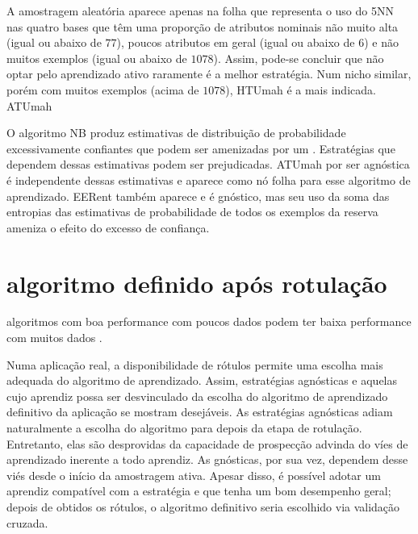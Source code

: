 A amostragem aleatória aparece apenas na folha que representa o uso do 5NN nas quatro bases que têm
uma proporção de atributos nominais não muito alta (igual ou abaixo de $77$),
poucos atributos em geral (igual ou abaixo de $6$) e não muitos exemplos (igual ou abaixo de $1078$).
Assim, pode-se concluir que não optar pelo aprendizado ativo raramente é a melhor estratégia.
Num nicho similar, porém com muitos exemplos (acima de $1078$), HTUmah é a mais indicada.
ATUmah

O algoritmo NB produz estimativas de distribuição de probabilidade excessivamente confiantes
que podem ser amenizadas por um  \citep{conf/icml/RoyM01}.
Estratégias que dependem dessas estimativas podem ser prejudicadas.
ATUmah por ser agnóstica é independente dessas estimativas e aparece como nó
folha para esse algoritmo de aprendizado.
EERent também aparece e é gnóstico,
mas seu uso da soma das entropias das estimativas de
probabilidade de todos os exemplos da reserva ameniza o efeito do excesso de confiança.

% 

\section{algoritmo definido após rotulação}\label{ind}
algoritmos com boa performance com poucos dados podem ter baixa
performance com muitos dados
\citep{journals/sigkdd/AttenbergP10,journals/jmlr/PerlichPS03}.


Numa aplicação real, a disponibilidade de rótulos permite uma escolha mais adequada
do algoritmo de aprendizado.
Assim, estratégias agnósticas e aquelas cujo aprendiz possa ser desvinculado da escolha do
algoritmo de aprendizado definitivo da aplicação se mostram desejáveis.
As estratégias agnósticas adiam naturalmente a escolha do algoritmo para depois da
etapa de rotulação.
Entretanto, elas são desprovidas da capacidade de prospecção advinda do víes de
aprendizado inerente a todo aprendiz.
As gnósticas, por sua vez, dependem desse viés desde o início da amostragem ativa.
Apesar disso, é possível adotar um aprendiz compatível com a estratégia e que tenha um bom
desempenho geral; depois de obtidos os rótulos, o algoritmo definitivo seria escolhido via validação
cruzada.

